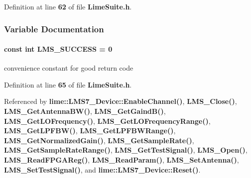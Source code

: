 Definition at line {\bf 62} of file {\bf Lime\+Suite.\+h}.



\subsubsection{Variable Documentation}
\paragraph[{L\+M\+S\+\_\+\+S\+U\+C\+C\+E\+SS}]{\setlength{\rightskip}{0pt plus 5cm}const {\bf int} L\+M\+S\+\_\+\+S\+U\+C\+C\+E\+SS = 0\hspace{0.3cm}{\ttfamily [static]}}\label{LimeSuite_8h_a4e3d4ee762ad993a404cb156d4b00243}


convenience constant for good return code 



Definition at line {\bf 65} of file {\bf Lime\+Suite.\+h}.



Referenced by {\bf lime\+::\+L\+M\+S7\+\_\+\+Device\+::\+Enable\+Channel()}, {\bf L\+M\+S\+\_\+\+Close()}, {\bf L\+M\+S\+\_\+\+Get\+Antenna\+B\+W()}, {\bf L\+M\+S\+\_\+\+Get\+Gaind\+B()}, {\bf L\+M\+S\+\_\+\+Get\+L\+O\+Frequency()}, {\bf L\+M\+S\+\_\+\+Get\+L\+O\+Frequency\+Range()}, {\bf L\+M\+S\+\_\+\+Get\+L\+P\+F\+B\+W()}, {\bf L\+M\+S\+\_\+\+Get\+L\+P\+F\+B\+W\+Range()}, {\bf L\+M\+S\+\_\+\+Get\+Normalized\+Gain()}, {\bf L\+M\+S\+\_\+\+Get\+Sample\+Rate()}, {\bf L\+M\+S\+\_\+\+Get\+Sample\+Rate\+Range()}, {\bf L\+M\+S\+\_\+\+Get\+Test\+Signal()}, {\bf L\+M\+S\+\_\+\+Open()}, {\bf L\+M\+S\+\_\+\+Read\+F\+P\+G\+A\+Reg()}, {\bf L\+M\+S\+\_\+\+Read\+Param()}, {\bf L\+M\+S\+\_\+\+Set\+Antenna()}, {\bf L\+M\+S\+\_\+\+Set\+Test\+Signal()}, and {\bf lime\+::\+L\+M\+S7\+\_\+\+Device\+::\+Reset()}.

